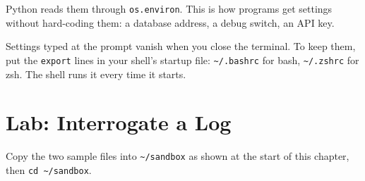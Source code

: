 Python reads them through \texttt{os.environ}. This is how programs get settings without hard-coding them: a database address, a debug switch, an API key.

Settings typed at the prompt vanish when you close the terminal. To keep them, put the \texttt{export} lines in your shell's startup file: \texttt{\textasciitilde{}/.bashrc} for bash, \texttt{\textasciitilde{}/.zshrc} for zsh. The shell runs it every time it starts.

\section{Lab: Interrogate a Log}\label{05-the-everyday-command-line:lab-interrogate-a-log}

Copy the two sample files into \texttt{\textasciitilde{}/sandbox} as shown at the start of this chapter, then \texttt{cd\ \textasciitilde{}/sandbox}.

